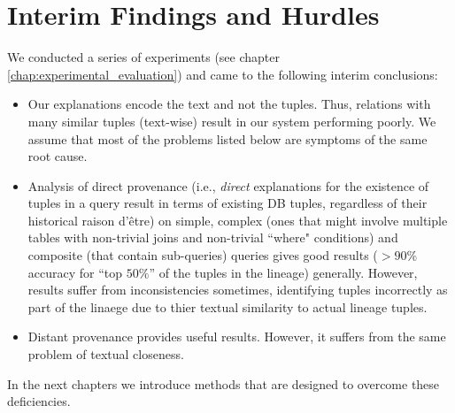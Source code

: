 \section{Interim Findings and Hurdles}
We conducted a series of experiments (see chapter \ref{chap:experimental_evaluation}) and came to the following interim conclusions:
\begin{itemize}
    \item Our explanations encode the text and not the tuples. Thus, relations with many similar tuples (text-wise) result in our system performing poorly. We assume that most of the problems listed below are symptoms of the same root cause.
    \item Analysis of direct provenance (i.e., \textit{direct} explanations for the existence of tuples in a query result in terms of existing DB tuples, regardless of their historical raison d'être) on simple, complex (ones that might involve multiple tables with non-trivial joins and non-trivial ``where" conditions) and composite (that contain sub-queries) queries gives good results ($> 90\%$ accuracy for ``top $50\%$'' of the tuples in the lineage) generally. However, results suffer from inconsistencies sometimes, identifying tuples incorrectly as part of the linaege due to thier textual similarity to actual lineage tuples.
    \item Distant provenance provides useful results. However, it suffers from the same problem of textual closeness.
\end{itemize}

\par In the next chapters we introduce methods that are designed to overcome these deficiencies.
